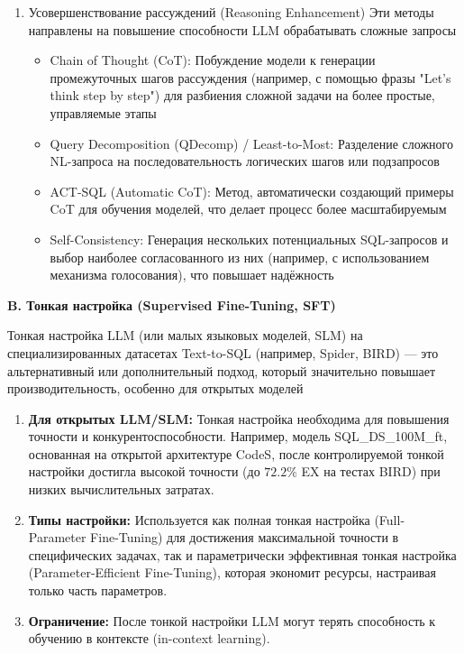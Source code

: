 \begin{enumerate}
    \item Усовершенствование рассуждений (Reasoning Enhancement) Эти методы направлены на повышение способности LLM обрабатывать сложные запросы
    \begin{itemize}
        \item Chain of Thought (CoT): Побуждение модели к генерации промежуточных шагов рассуждения (например, с помощью фразы "Let's think step by step") для разбиения сложной задачи на более простые, управляемые этапы
        \item Query Decomposition (QDecomp) / Least-to-Most: Разделение сложного NL-запроса на последовательность логических шагов или подзапросов
        \item ACT-SQL (Automatic CoT): Метод, автоматически создающий примеры CoT для обучения моделей, что делает процесс более масштабируемым
        \item Self-Consistency: Генерация нескольких потенциальных SQL-запросов и выбор наиболее согласованного из них (например, с использованием механизма голосования), что повышает надёжность
    \end{itemize}

\end{enumerate}


\textbf{B. Тонкая настройка (Supervised Fine-Tuning, SFT)}

Тонкая настройка LLM (или малых языковых моделей, SLM) на специализированных датасетах Text-to-SQL (например, Spider, BIRD) — это альтернативный или дополнительный подход, который значительно повышает производительность, особенно для открытых моделей

\begin{enumerate}
    \item \textbf{Для открытых LLM/SLM:} Тонкая настройка необходима для повышения точности и конкурентоспособности. Например, модель SQL\_DS\_100M\_ft, основанная на открытой архитектуре CodeS, после контролируемой тонкой настройки достигла высокой точности (до $72.2\%$ EX на тестах BIRD) при низких вычислительных затратах.
    
    \item \textbf{Типы настройки:} Используется как полная тонкая настройка (Full-Parameter Fine-Tuning) для достижения максимальной точности в специфических задачах, так и параметрически эффективная тонкая настройка (Parameter-Efficient Fine-Tuning), которая экономит ресурсы, настраивая только часть параметров.
    
    \item \textbf{Ограничение:} После тонкой настройки LLM могут терять способность к обучению в контексте (in-context learning).
\end{enumerate}

